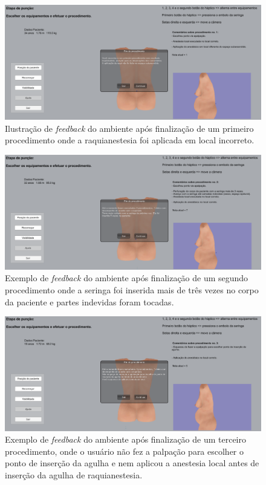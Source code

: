 \begin{figure}[ht!]
    \centering
    \includegraphics[width=\textwidth]{capitulos/figuras/sistema-exemplo-execucao-procedimento-1.png} 
    \caption{Ilustração de \textit{feedback} do ambiente após finalização de um primeiro procedimento onde a raquianestesia foi aplicada em local incorreto.}
    \label{fig:sistemaExecucao1RaquiLocalIncorreto}
\end{figure}

\begin{figure}[ht!]
    \centering
    \includegraphics[width=\textwidth]{capitulos/figuras/sistema-exemplo-execucao-procedimento-2.png} 
    \caption{Exemplo de \textit{feedback} do ambiente após finalização de um segundo procedimento onde a seringa foi inserida mais de três vezes no corpo da paciente e partes indevidas foram tocadas.}
    \label{fig:sistemaExecucao2seringaCorreto}
\end{figure}

\begin{figure}[ht!]
    \centering
    \includegraphics[width=\textwidth]{capitulos/figuras/sistema-exemplo-execucao-procedimento-3.png} 
    \caption{Exemplo de \textit{feedback} do ambiente após finalização de um terceiro procedimento, onde o usuário não fez a palpação para escolher o ponto de inserção da agulha e nem aplicou a anestesia local antes de inserção da agulha de raquianestesia.}
    \label{fig:sistemaExecucao3faltouApalpacaoAnestesiaLocalIncorreto}
\end{figure}

